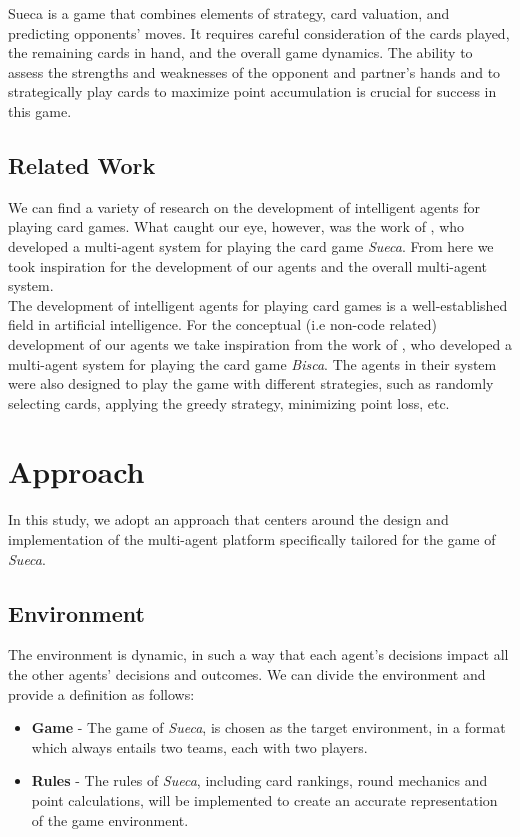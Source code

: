 \documentclass[sigconf]{acmart}
\begin{document}
\noindent Sueca is a game that combines elements of strategy, card valuation, and predicting opponents' moves. It requires careful consideration of the cards played, the remaining cards in hand, and the overall game dynamics. The ability to assess the strengths and weaknesses of the opponent and partner's hands and to strategically play cards to maximize point accumulation is crucial for success in this game.

\subsection{Related Work}
We can find a variety of research on the development of intelligent agents for playing card games. What caught our eye, however, was the work of \cite{emys2015}, who developed a multi-agent system for playing the card game \textit{Sueca}. From here we took inspiration for the development of our agents and the overall multi-agent system.\\

\noindent The development of intelligent agents for playing card games is a well-established field in artificial intelligence. For the conceptual (i.e non-code related) development of our agents we take inspiration from the work of \cite{basis2023}, who developed a multi-agent system for playing the card game \textit{Bisca}. The agents in their system were also designed to play the game with different strategies, such as randomly selecting cards, applying the greedy strategy, minimizing point loss, etc.\\

\section{Approach}
In this study, we adopt an approach that centers around the design
and implementation of the multi-agent platform specifically tailored
for the game of \textit{Sueca}.

\subsection{Environment}
The environment is dynamic, in such a way that each agent's decisions impact all the other agents' decisions and outcomes. We can divide the environment and provide a definition as follows:
\begin{itemize}
    \item \textbf{Game} - The game of \textit{Sueca}, is chosen as the target environment, in a format which always entails two teams, each with two players.
    \item \textbf{Rules} - The rules of \textit{Sueca}, including card rankings, round mechanics and point calculations, will be implemented to create an accurate representation of the game environment.
\end{itemize}
\end{document}
